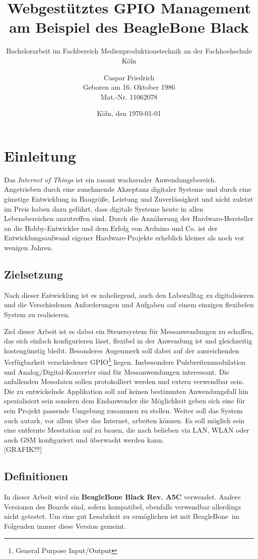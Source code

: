 \documentclass[12pt, twoside, a4paper]{scrbook}
\author{Caspar Friedrich\\Geboren am 16. Oktober 1986\\Mat.-Nr. 11062078}
\date{Köln, den \today}
\subtitle{Bachelorarbeit im Fachbereich Medienproduktionstechnik an der Fachhochschule Köln}
\title{Webgestütztes GPIO Management am Beispiel des BeagleBone Black}
\begin{document}
\maketitle
\tableofcontents
\listoffigures
\listoftables

\chapter{Einleitung}
Das \textit{Internet of Things} ist ein rasant wachsender Anwendungsbereich. Angetrieben durch eine zunehmende Akzeptanz digitaler Systeme und durch eine günstige Entwicklung in Baugröße, Leistung und Zuverlässigkeit und nicht zuletzt im Preis haben dazu geführt, dass   digitale Systeme heute in allen Lebensbereichen anzutreffen sind.
Durch die Annäherung der Hardware-Hersteller an die \glqq Hobby\grqq -Entwickler und dem Erfolg von Arduino und Co. ist der Entwicklungsaufwand eigener Hardware-Projekte erheblich kleiner als noch vor wenigen Jahren.


\section{Zielsetzung}
Nach dieser Entwicklung ist es naheliegend, auch den Laboralltag zu digitalisieren und die Verschiedenen Anforderungen und Aufgaben auf einem einzigen flexibelen System zu realisieren.

Ziel dieser Arbeit ist es dabei ein Steuersystem für Messanwendungen zu schaffen, das sich einfach konfigurieren lässt, flexibel in der Anwendung ist und gleichzeitig kostengünstig bleibt. Besonderes Augenmerk soll dabei auf der ausreichenden Verfügbarkeit verschiedener GPIO\footnote{General Purpose Input/Output} liegen. Insbesondere Pulsbreitenmodulation und Analog/Digital-Konverter sind für Messanwendungen interessant. Die anfallenden Messdaten sollen protokolliert werden und extern verwendbar sein. Die zu entwickelnde Applikation soll auf keinen bestimmten Anwendungsfall hin spezialisiert sein sondern dem Endanwender die Möglichkeit geben sich eine für sein Projekt passende Umgebung zusammen zu stellen. Weiter soll das System auch autark, vor allem über das Internet, arbeiten können. Es soll möglich sein eine entfernte Messtation auf zu bauen, die nach belieben via LAN, WLAN oder auch GSM konfiguriert und überwacht werden kann.\\

[GRAFIK!!!]


\section{Definitionen}
In dieser Arbeit wird ein \textbf{BeagleBone Black Rev. A5C} verwendet. Andere Versionen des Boards sind, sofern kompatibel, ebenfalls verwendbar allerdings nicht getestet. Um eine gut Lesabrkeit zu ermöglichen ist mit \glqq BeagleBone\grqq ~im Folgenden immer diese Version gemeint. 
\end{document}
